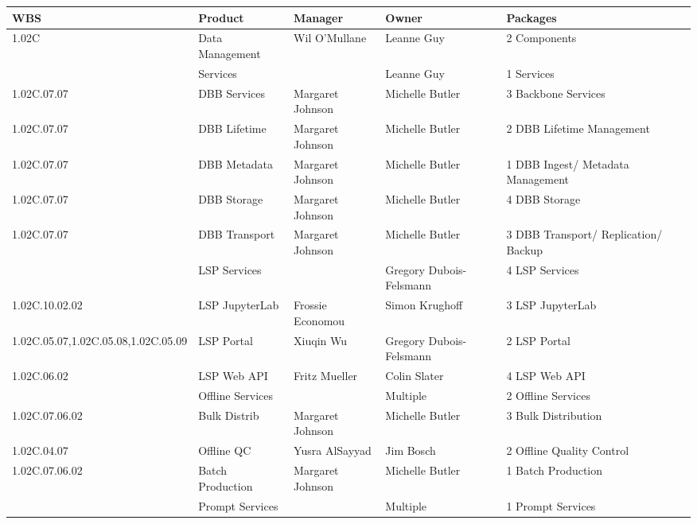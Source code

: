 

\tiny
\begin{longtable}{|p{}|p{}|p{}|p{}|p{}|p{}|}\hline
\textbf{WBS} & Product & Manager & Owner & Packages\\ \hline
1.02C &  Data Management & Wil O'Mullane & Leanne Guy & 2 Components\\ \hline
 &  Services &  & Leanne Guy & 1 Services\\ \hline
1.02C.07.07 &  DBB Services & Margaret Johnson & Michelle Butler & 3 Backbone Services\\ \hline
1.02C.07.07 &  DBB Lifetime & Margaret Johnson & Michelle Butler & 2 DBB Lifetime Management\\ \hline
1.02C.07.07 &  DBB Metadata & Margaret Johnson & Michelle Butler & 1 DBB Ingest/ Metadata Management\\ \hline
1.02C.07.07 &  DBB Storage & Margaret Johnson & Michelle Butler & 4 DBB Storage\\ \hline
1.02C.07.07 &  DBB Transport & Margaret Johnson & Michelle Butler & 3 DBB Transport/ Replication/ Backup\\ \hline
 &  LSP Services &  & Gregory Dubois-Felsmann & 4 LSP Services\\ \hline
1.02C.10.02.02 &  LSP JupyterLab & Frossie Economou & Simon Krughoff & 3 LSP JupyterLab\\ \hline
1.02C.05.07,1.02C.05.08,1.02C.05.09 &  LSP Portal & Xiuqin Wu & Gregory Dubois-Felsmann & 2 LSP Portal\\ \hline
1.02C.06.02 &  LSP Web API & Fritz Mueller & Colin Slater & 4 LSP Web API\\ \hline
 &  Offline Services &  & Multiple & 2 Offline Services\\ \hline
1.02C.07.06.02 &  Bulk Distrib & Margaret Johnson & Michelle Butler & 3 Bulk Distribution\\ \hline
1.02C.04.07 &  Offline QC & Yusra AlSayyad & Jim Bosch & 2 Offline Quality Control\\ \hline
1.02C.07.06.02 &  Batch Production & Margaret Johnson & Michelle Butler & 1 Batch Production\\ \hline
 &  Prompt Services &  & Multiple & 1 Prompt Services\\ \hline

\end{longtable}
